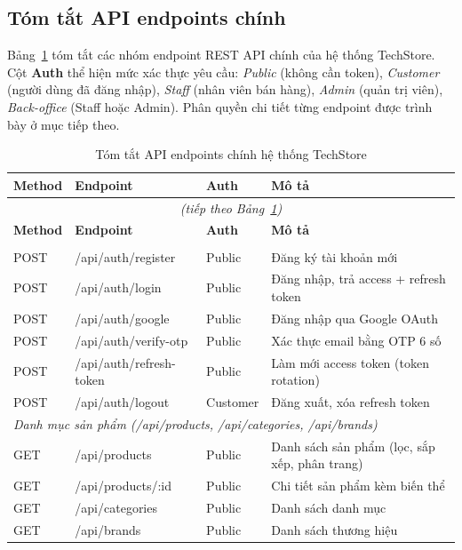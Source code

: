 \subsection{Tóm tắt API endpoints chính}
\label{sec:c3_api_summary}

Bảng~\ref{tab:api_summary} tóm tắt các nhóm endpoint REST API chính của hệ thống TechStore. Cột \textbf{Auth} thể hiện mức xác thực yêu cầu: \textit{Public} (không cần token), \textit{Customer} (người dùng đã đăng nhập), \textit{Staff} (nhân viên bán hàng), \textit{Admin} (quản trị viên), \textit{Back-office} (Staff hoặc Admin). Phân quyền chi tiết từng endpoint được trình bày ở mục tiếp theo.

{\footnotesize
\begin{longtable}{|l|p{5.0cm}|l|p{4.5cm}|}
  \caption{Tóm tắt API endpoints chính hệ thống TechStore}
  \label{tab:api_summary} \\
  \hline
  \textbf{Method} & \textbf{Endpoint} & \textbf{Auth} & \textbf{Mô tả} \\
  \hline
  \endfirsthead
  \multicolumn{4}{c}{\textit{(tiếp theo Bảng~\ref{tab:api_summary})}} \\
  \hline
  \textbf{Method} & \textbf{Endpoint} & \textbf{Auth} & \textbf{Mô tả} \\
  \hline
  \endhead
  \hline
  \endfoot

  \multicolumn{4}{|l|}{\textit{Xác thực (/api/auth)}} \\
  \hline
  POST & /api/auth/register & Public & Đăng ký tài khoản mới \\
  \hline
  POST & /api/auth/login & Public & Đăng nhập, trả access + refresh token \\
  \hline
  POST & /api/auth/google & Public & Đăng nhập qua Google OAuth \\
  \hline
  POST & /api/auth/verify-otp & Public & Xác thực email bằng OTP 6 số \\
  \hline
  POST & /api/auth/refresh-token & Public & Làm mới access token (token rotation) \\
  \hline
  POST & /api/auth/logout & Customer & Đăng xuất, xóa refresh token \\
  \hline

  \multicolumn{4}{|l|}{\textit{Danh mục sản phẩm (/api/products, /api/categories, /api/brands)}} \\
  \hline
  GET & /api/products & Public & Danh sách sản phẩm (lọc, sắp xếp, phân trang) \\
  \hline
  GET & /api/products/:id & Public & Chi tiết sản phẩm kèm biến thể \\
  \hline
  GET & /api/categories & Public & Danh sách danh mục \\
  \hline
  GET & /api/brands & Public & Danh sách thương hiệu \\
  \hline


\end{longtable}}
